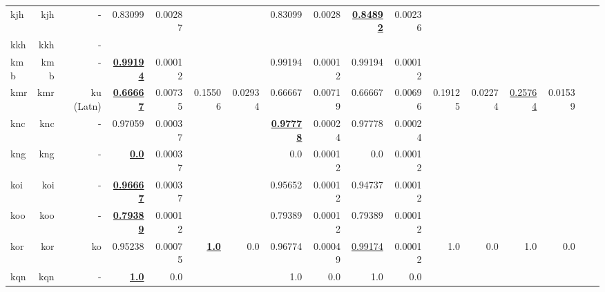 \documentclass[11pt]{article}
\begin{document}
\begin{table*}[h]
{\begin{tabular}{lrrrrrrrrrrrrrrrr}
kjh         & kjh         & -         & 0.83099         & 0.00287         &          &          & 0.83099         & 0.0028         & \textbf{\underline{0.84892}}         & 0.00236         &          &          &          &          \\
kkh         & kkh         & -         &          &          &          &          &          &          &          &          &          &          &          &          \\
kmb         & kmb         & -         & \textbf{\underline{0.99194}}         & 0.00012         &          &          & 0.99194         & 0.00012         & 0.99194         & 0.00012         &          &          &          &          \\
kmr         & kmr         & ku (Latn)         & \textbf{\underline{0.66667}}         & 0.00735         & 0.15506         & 0.02934         & 0.66667         & 0.00719         & 0.66667         & 0.00696         & 0.19125         & 0.02274         & \underline{0.25764}         & 0.01539         \\
knc         & knc         & -         & 0.97059         & 0.00037         &          &          & \textbf{\underline{0.97778}}         & 0.00024         & 0.97778         & 0.00024         &          &          &          &          \\
kng         & kng         & -         & \textbf{\underline{0.0}}         & 0.00037         &          &          & 0.0         & 0.00012         & 0.0         & 0.00012         &          &          &          &          \\
koi         & koi         & -         & \textbf{\underline{0.96667}}         & 0.00037         &          &          & 0.95652         & 0.00012         & 0.94737         & 0.00012         &          &          &          &          \\
koo         & koo         & -         & \textbf{\underline{0.79389}}         & 0.00012         &          &          & 0.79389         & 0.00012         & 0.79389         & 0.00012         &          &          &          &          \\
kor         & kor         & ko         & 0.95238         & 0.00075         & \textbf{\underline{1.0}}         & 0.0         & 0.96774         & 0.00049         & \underline{0.99174}         & 0.00012         & 1.0         & 0.0         & 1.0         & 0.0         \\
kqn         & kqn         & -         & \textbf{\underline{1.0}}         & 0.0         &          &          & 1.0         & 0.0         & 1.0         & 0.0         &          &          &          &          \\

\end{tabular}}
\end{table*}
\end{document}
